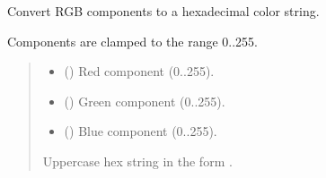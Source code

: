 \documentclass[letterpaper,10pt,english]{sphinxmanual}
\begin{document}
\begin{fulllineitems}
\label{\detokenize{api/colors:colors.rgb_to_hex}}
\pysigstartsignatures
\pysiglinewithargsret
{}
{\sphinxparamcomma {}\sphinxparamcomma {}}
{}
\pysigstopsignatures
\sphinxAtStartPar
Convert RGB components to a hexadecimal color string.

\sphinxAtStartPar
Components are clamped to the range 0..255.
\begin{quote}\begin{description}
\begin{itemize}
\item {} 
\sphinxAtStartPar
{} () \textendash{} Red component (0..255).

\item {} 
\sphinxAtStartPar
{} () \textendash{} Green component (0..255).

\item {} 
\sphinxAtStartPar
{} () \textendash{} Blue component (0..255).

\end{itemize}

\sphinxAtStartPar
{}

\sphinxAtStartPar
Uppercase hex string in the form .

\end{description}\end{quote}

\end{fulllineitems}

\end{document}
